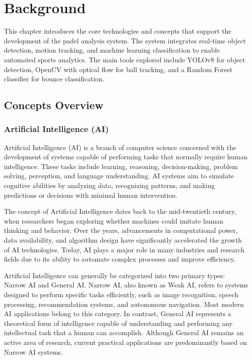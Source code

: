 \chapter{Background}\label{chap:background}
This chapter introduces the core technologies and concepts that support the development of the padel analysis system. The system integrates real-time object detection, motion tracking, and machine learning classification to enable automated sports analytics. The main tools explored include YOLOv8 for object detection, OpenCV with optical flow for ball tracking, and a Random Forest classifier for bounce classification.

\section{Concepts Overview} \label{sec:s1}

\subsection{Artificial Intelligence (AI)}

Artificial Intelligence (AI) is a branch of computer science concerned with the development of systems capable of performing tasks that normally require human intelligence. These tasks include learning, reasoning, decision-making, problem solving, perception, and language understanding. AI systems aim to simulate cognitive abilities by analyzing data, recognizing patterns, and making predictions or decisions with minimal human intervention.

The concept of Artificial Intelligence dates back to the mid-twentieth century, when researchers began exploring whether machines could imitate human thinking and behavior. Over the years, advancements in computational power, data availability, and algorithm design have significantly accelerated the growth of AI technologies. Today, AI plays a major role in many industries and research fields due to its ability to automate complex processes and improve efficiency.

Artificial Intelligence can generally be categorized into two primary types: Narrow AI and General AI. Narrow AI, also known as Weak AI, refers to systems designed to perform specific tasks efficiently, such as image recognition, speech processing, recommendation systems, and autonomous navigation. Most modern AI applications belong to this category. In contrast, General AI represents a theoretical form of intelligence capable of understanding and performing any intellectual task that a human can accomplish. Although General AI remains an active area of research, current practical applications are predominantly based on Narrow AI systems.

